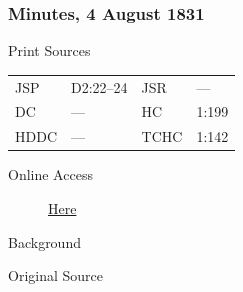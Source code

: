 		\subsubsection{Minutes, 4 August 1831}
			\label{EMS-1831-JS-4-AUG-1831}
		
			\begin{description}
				\item[Print Sources]
			\end{description}

				\begin{tabular}{p{0.5in}p{1in}p{0.5in}p{1in}}
				JSP	 	& D2:22--24		& JSR 		& --- \\
				DC	 	& --- 			& HC 		& 1:199 \\
				HDDC 	& ---			& TCHC 		& 1:142 \\
				\end{tabular}
			
			\begin{description}
				\item[Online Access] \href{https://www.josephsmithpapers.org/paper-summary/minutes-4-august-1831/1}{Here}
			\end{description}
			
			\begin{description}
				\item[Background]
			\end{description}
			
			
			\begin{description}
				\item[Original Source]
			\end{description}
			
			
